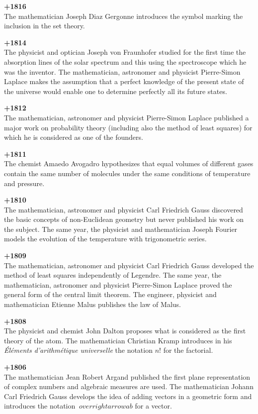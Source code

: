 \textbf{+1816}\\
The mathematician Joseph Diaz Gergonne introduces the symbol marking the inclusion in the set theory.

\textbf{+1814}\\
The physicist and optician Joseph von Fraunhofer studied for the first time the absorption lines of the solar spectrum and this using the spectroscope which he was the inventor. The mathematician, astronomer and physicist Pierre-Simon Laplace makes the assumption that a perfect knowledge of the present state of the universe would enable one to determine perfectly all its future states.

\textbf{+1812}\\
The mathematician, astronomer and physicist Pierre-Simon Laplace published a major work on probability theory (including also the method of least squares) for which he is considered as one of the founders.

\textbf{+1811}\\
The chemist Amaedo Avogadro hypothesizes that equal volumes of different gases contain the same number of molecules under the same conditions of temperature and pressure.

\textbf{+1810}\\
The mathematician, astronomer and physicist Carl Friedrich Gauss discovered the basic concepts of non-Euclidean geometry but never published his work on the subject. The same year, the physicist and mathematician Joseph Fourier models the evolution of the temperature with trigonometric series.

\textbf{+1809}\\
The mathematician, astronomer and physicist Carl Friedrich Gauss developed the method of least squares independently of Legendre. The same year, the mathematician, astronomer and physicist Pierre-Simon Laplace proved the general form of the central limit theorem. The engineer, physicist and mathematician Etienne Malus publishes the law of Malus.

\textbf{+1808}\\
The physicist and chemist John Dalton proposes what is considered as the first theory of the atom. The mathematician Christian Kramp introduces in his \textit{Éléments d'arithmétique universelle} the notation $n!$ for the factorial.

\textbf{+1806}\\
The mathematician Jean Robert Argand published the first plane representation of complex numbers and algebraic measures are used. The mathematician Johann Carl Friedrich Gauss develops the idea of adding vectors in a geometric form and introduces the notation $\ overrightarrow{ab}$ for a vector.

